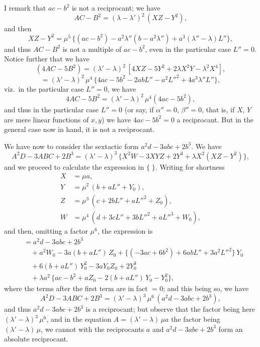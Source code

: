 \documentclass[11pt]{article}
\begin{document}
I remark that $ac - b^2$ is not a reciprocant; we have
\[ AC - B^2 = (\lambda - \lambda')^2\,(XZ - Y^2), \]
and then
\[ XZ - Y^2 = \mu^5\,\{(ac - b^2) - a^2\lambda''(b - a^2\lambda'') + a^3(\lambda'' - \lambda)L''\}, \]
and thus $AC - B^2$ is not a multiple of $ac - b^2$, even in the particular case $L'' = 0$. Notice further that we have
\[ (4AC - 5B^2) = (\lambda' - \lambda)^2\,[4XZ - 5Y^2 + 2\lambda X^2Y - \lambda^2X^4], \]
\[ = (\lambda' - \lambda)^2\,\mu^4\,\{4ac - 5b^2 - 2abL'' - a^2L''^2 + 4a^3\lambda''L''\}, \]
viz.\ in the particular case $L'' = 0$, we have
\[ 4AC - 5B^2 = (\lambda' - \lambda)^2\,\mu^4(4ac - 5b^2), \]
and thus in the particular case $L'' = 0$ (or say, if $\alpha'' = 0$, $\beta'' = 0$, that is, if $X$, $Y$ are mere linear functions of $x, y$) we have $4ac - 5b^2 = 0$ a reciprocant. But in the general case now in hand, it is not a reciprocant.

We have now to consider the sextactic form $a^2d - 3abc + 2b^3$. We have
\[ A^2D - 3ABC + 2B^3 = (\lambda' - \lambda)^3\,\{X^2W - 3XYZ + 2Y^3 + \lambda X^2(XZ - Y^2)\}, \]
and we proceed to calculate the expression in $\{\;\}$. Writing for shortness
\begin{align*}
X &= \mu a,\\
Y &= \mu^2\,(b + aL'' + Y_0),\\
Z &= \mu^3\,(c + 2bL'' + aL''^2 + Z_0),\\
W &= \mu^4\,(d + 3cL'' + 3bL''^2 + aL''^3 + W_0),
\end{align*}
and then, omitting a factor $\mu^6$, the expression is
\begin{align*}
&= a^2d - 3abc + 2b^3\\
&\quad + a^2W_0 - 3a(b + aL'')\,Z_0 + \{(-3ac + 6b^2) + 6abL'' + 3a^2L''^2\}\,Y_0\\
&\quad + 6(b + aL'')\,Y_0^2 - 3aY_0Z_0 + 2Y_0^3\\
&\quad + \lambda a^2\,\{ac - b^2 + aZ_0 - 2(b + aL'')\,Y_0 - Y_0^2\},
\end{align*}
where the terms after the first term are in fact $=0$; and this being so, we have
\[ A^2D - 3ABC + 2B^3 = (\lambda' - \lambda)^3\,\mu^6\,(a^2d - 3abc + 2b^3), \]
and thus $a^2d - 3abc + 2b^3$ is a reciprocant; but observe that the factor being here $(\lambda' - \lambda)^3\,\mu^6$, and in the equation $A = (\lambda' - \lambda)\,\mu a$ the factor being $(\lambda' - \lambda)\,\mu$, we cannot with the reciprocants $a$ and $a^2d - 3abc + 2b^3$ form an absolute reciprocant.
\end{document}

